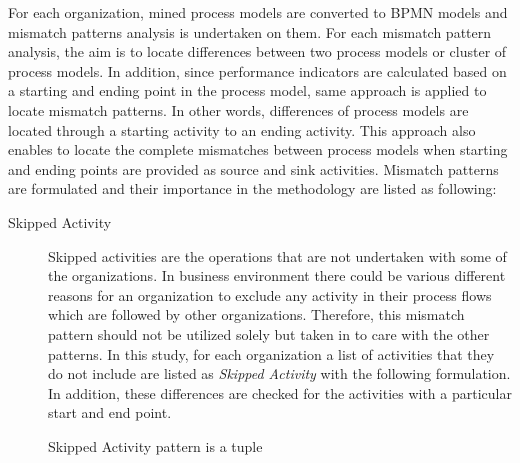 For each organization, mined process models are converted to BPMN models and mismatch patterns analysis is undertaken on them. For each mismatch pattern analysis, the aim is to locate differences between two process models or cluster of process models. In addition, since performance indicators are calculated based on a starting and ending point in the process model, same approach is applied to locate mismatch patterns. In other words, differences of process models are located through a starting activity to an ending activity. This approach also enables to locate the complete mismatches between process models when starting and ending points are provided as source and sink activities. Mismatch patterns are formulated and their importance in the methodology are listed as following:
\begin{description}
  \item[Skipped Activity] Skipped activities are the operations that are not undertaken with some of the organizations. In business environment there could be various different reasons for an organization to exclude any activity in their process flows which are followed by other organizations. Therefore, this mismatch pattern should not be utilized solely but taken in to care with the other patterns. In this study, for each organization a list of activities that they do not include are listed as \textit{Skipped Activity} with the following formulation. In addition, these differences are checked for the activities with a particular start and end point. 
		\theoremstyle{definition}
		\begin{definition}
		Skipped Activity pattern is a tuple 


\end{definition}
\end{description}
